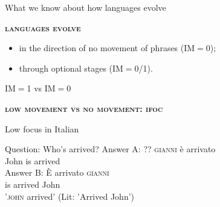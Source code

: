 \documentclass[lesson_slides]{subfiles}
\begin{document}
\begin{frame}[c]{What we know about how languages evolve}

        \noindent \textbf{\textsc{languages evolve}} \pause
        \begin{itemize}
            \item[\ding{227}] in the direction of no movement of phrases (IM$=$0); \pause
            \item[\ding{227}] through optional stages (IM$=$0/1).
        \end{itemize}


\end{frame}
\begin{frame}[c]{IM$=$1 vs IM$=$0}

    \noindent \textbf{\textsc{low movement vs no movement: ifoc}} \pause

    \begin{exe}
    \ex Low focus in Italian \pause
        \begin{xlist}
        \ex Question: Who's arrived?
        \ex \gll Answer A: ?? \textsc{gianni} è arrivato\\
        {} {} {} John is arrived\\ \pause
        \ex \gll Answer B: È arrivato \textsc{gianni}\\
        {} {} is arrived John\\ 
        \glt \hspace{16mm} '\textsc{john} arrived' (Lit: 'Arrived John')
        \end{xlist}
    \end{exe}

\end{frame}
\end{document}
